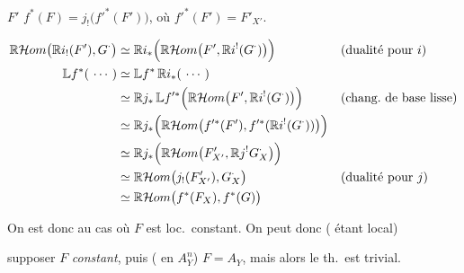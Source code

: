 \documentclass[11pt,a4paper]{article}
\begin{document}

$F'$ \qquad $f^{*}(F)=j_!\bigl(f'^{*}(F')\bigr)$, où $f'^{*}(F')=F'_{X'}$.

\begin{align*}
\mathbb{R}\mathcal{H}om\bigl(\mathbb{R}i_!(F'),G^{\cdot}\bigr)&\simeq\mathbb{R}i_{*}\Bigl(\mathbb{R}\mathcal{H}om\bigl(F',\mathbb{R}i^!(G^{\cdot})\bigr)\Bigr)
&&\text{(dualité pour $i$)}\\
\mathbb{L}f^{*}(\ \cdots\ )&\simeq\mathbb{L}f^{*}\,\mathbb{R}i_{*}(\ \cdots\ )\\
&\simeq\mathbb{R}j_{*}\,\mathbb{L}f'^{*}\Bigl(\mathbb{R}\mathcal{H}om\bigl(F',\mathbb{R}i^!(G^{\cdot})\bigr)\Bigr)
&&\text{(chang.\ de base lisse)}\\
&\simeq\mathbb{R}j_{*}\Bigl(\mathbb{R}\mathcal{H}om\bigl(f'^{*}(F'),f'^{*}(\mathbb{R}i^!(G^{\cdot}))\bigr)\Bigr)\\
&\simeq\mathbb{R}j_{*}\Bigl(\mathbb{R}\mathcal{H}om\bigl(F'_{X'},\mathbb{R}j^!G^{\cdot}_{X}\bigr)\Bigr)\\
&\simeq\mathbb{R}\mathcal{H}om\bigl(j_!(F'_{X'}),G^{\cdot}_{X}\bigr)
&&\text{(dualité pour $j$)}\\
&\simeq\mathbb{R}\mathcal{H}om\bigl(f^{*}(F_{X}),f^{*}(G)\bigr)
\end{align*}

On est  donc au cas où $F$ est loc.\ constant. On peut donc ( étant local)

supposer $F$ \emph{constant}, puis ( \ill{}  en $A_{Y}^{n}$) $F=A_{Y}$, mais alors le th.\ est trivial.
\end{document}
